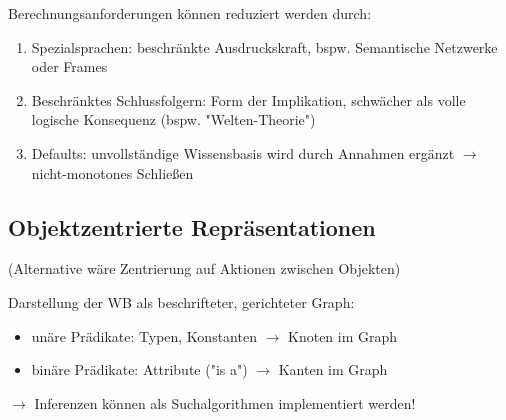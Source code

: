 \documentclass[runningheads,deutsch]{llncs}
\begin{document}
Berechnungsanforderungen können reduziert werden durch:

\begin{enumerate}
    \item Spezialsprachen: beschränkte Ausdruckskraft, bspw. Semantische Netzwerke oder Frames
    \item Beschränktes Schlussfolgern: Form der Implikation, schwächer als volle logische Konsequenz (bspw. "Welten-Theorie")
    \item Defaults: unvollständige Wissensbasis wird durch Annahmen ergänzt $\rightarrow$ nicht-monotones Schließen
\end{enumerate}

\subsection{Objektzentrierte Repräsentationen}
(Alternative wäre Zentrierung auf Aktionen zwischen Objekten)

Darstellung der WB als beschrifteter, gerichteter Graph:
\begin{itemize}
    \item unäre Prädikate: Typen, Konstanten $\rightarrow$ Knoten im Graph
    \item binäre Prädikate: Attribute ("is a") $\rightarrow$ Kanten im Graph
\end{itemize}

$\rightarrow$ Inferenzen können als Suchalgorithmen implementiert werden!



\pagebreak
\end{document}
